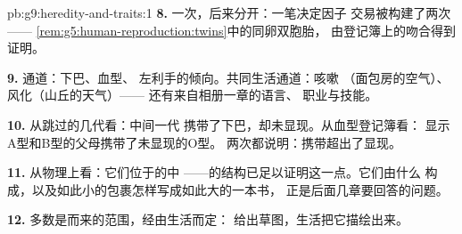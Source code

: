 \begin{solution}{pb:g9:heredity-and-traits:1}
\textbf{8.} 一次，后来分开：一笔决定因子
交易被构建了两次——
\cref{rem:g5:human-reproduction:twins}中的同卵双胞胎，
由登记簿上的吻合得到证明。

\textbf{9.} 通道：下巴、血型、
左利手的倾向。共同生活通道：咳嗽
（面包房的空气）、风化（山丘的天气）——
还有来自相册一章的语言、
职业与技能。

\textbf{10.} 从跳过的几代看：中间一代
携带了下巴，却未显现。从血型登记簿看：
显示A型和B型的父母携带了未显现的O型。
两次都说明：携带超出了显现。

\textbf{11.} 从物理上看：它们位于的中
——的结构已足以证明这一点。它们由什么
构成，以及如此小的包裹怎样写成如此大的一本书，
正是后面几章要回答的问题。

\textbf{12.} 多数是而来的范围，经由生活而定：
给出草图，生活把它描绘出来。
\end{solution}
